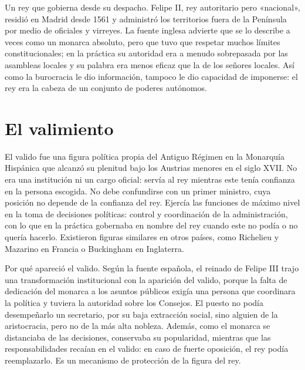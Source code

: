 \documentclass{book}
\begin{document}

Un rey que gobierna desde su despacho. Felipe II, rey autoritario pero «nacional», residió en Madrid desde 1561 y administró los territorios fuera de la Península por medio de oficiales y virreyes. La fuente inglesa advierte que se lo describe a veces como un monarca absoluto, pero que tuvo que respetar muchos límites constitucionales; en la práctica su autoridad era a menudo sobrepasada por las asambleas locales y su palabra era menos eficaz que la de los señores locales. Así como la burocracia le dio información, tampoco le dio capacidad de imponerse: el rey era la cabeza de un conjunto de poderes autónomos.


\section{El valimiento}

El valido fue una figura política propia del Antiguo Régimen en la Monarquía Hispánica que alcanzó su plenitud bajo los Austrias menores en el siglo XVII. No era una institución ni un cargo oficial: servía al rey mientras este tenía confianza en la persona escogida. No debe confundirse con un primer ministro, cuya posición no depende de la confianza del rey. Ejercía las funciones de máximo nivel en la toma de decisiones políticas: control y coordinación de la administración, con lo que en la práctica gobernaba en nombre del rey cuando este no podía o no quería hacerlo. Existieron figuras similares en otros países, como Richelieu y Mazarino en Francia o Buckingham en Inglaterra.


Por qué apareció el valido. Según la fuente española, el reinado de Felipe III trajo una transformación institucional con la aparición del valido, porque la falta de dedicación del monarca a los asuntos públicos exigía una persona que coordinara la política y tuviera la autoridad sobre los Consejos. El puesto no podía desempeñarlo un secretario, por su baja extracción social, sino alguien de la aristocracia, pero no de la más alta nobleza. Además, como el monarca se distanciaba de las decisiones, conservaba su popularidad, mientras que las responsabilidades recaían en el valido: en caso de fuerte oposición, el rey podía reemplazarlo. Es un mecanismo de protección de la figura del rey.
\end{document}

